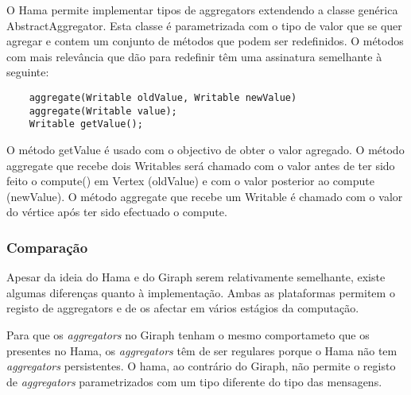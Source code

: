     O Hama permite implementar tipos de aggregators extendendo a classe genérica AbstractAggregator.
    Esta classe é parametrizada com o tipo de valor que se quer agregar e contem um conjunto de métodos que podem ser redefinidos.
    O métodos com mais relevância que dão para redefinir têm uma assinatura semelhante à seguinte:
    \begin{lstlisting}
    aggregate(Writable oldValue, Writable newValue)			  
    aggregate(Writable value);
    Writable getValue();
    \end{lstlisting}
    O método getValue é usado com o objectivo de obter o valor agregado. 
    O método aggregate que recebe dois Writables será chamado com o valor antes de ter sido feito o compute() em Vertex (oldValue) e com
    o valor posterior ao compute (newValue). O método aggregate que recebe um Writable é chamado com o valor do vértice após ter sido efectuado
    o compute. 

  \subsubsection*{Comparação}
  
  Apesar da ideia do Hama e do Giraph serem relativamente semelhante, existe algumas diferenças quanto à implementação. Ambas as plataformas
  permitem o registo de aggregators e de os afectar em vários estágios da computação. 
  
  Para que os \textit{aggregators} no Giraph tenham o mesmo comportameto que os presentes no Hama, os \textit{aggregators} têm de ser regulares porque o Hama não tem \textit{aggregators} persistentes. O hama, ao contrário do Giraph, não permite o registo de \textit{aggregators} parametrizados com um tipo diferente do tipo das mensagens.
  
